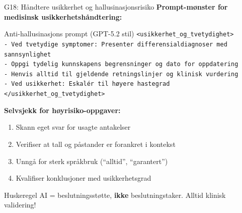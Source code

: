 \documentclass[aspectratio=169, 10pt]{beamer}
\begin{document}
\begin{frame}{G18: Håndtere usikkerhet og hallusinasjonsrisiko}
    \textbf{Prompt-mønster for medisinsk usikkerhetshåndtering:}
    
    \vspace{0.2cm}
    \begin{block}{\footnotesize Anti-hallusinasjons prompt (GPT-5.2 stil)}
        \scriptsize
        \texttt{<usikkerhet\_og\_tvetydighet>} \\
        \texttt{- Ved tvetydige symptomer: Presenter differensialdiagnoser med sannsynlighet} \\
        \texttt{- Oppgi tydelig kunnskapens begrensninger og dato for oppdatering} \\
        \texttt{- Henvis alltid til gjeldende retningslinjer og klinisk vurdering} \\
        \texttt{- Ved usikkerhet: Eskalér til høyere hastegrad} \\
        \texttt{</usikkerhet\_og\_tvetydighet>}
    \end{block}
    
    \vspace{0.15cm}
    \textbf{Selvsjekk for høyrisiko-oppgaver:}
    \footnotesize
    \begin{enumerate}
        \item Skann eget svar for usagte antakelser
        \item Verifiser at tall og påstander er forankret i kontekst
        \item Unngå for sterk språkbruk (``alltid'', ``garantert'')
        \item Kvalifiser konklusjoner med usikkerhetsgrad
    \end{enumerate}
    
    \normalsize
    \begin{alertblock}{\footnotesize Huskeregel}
        \footnotesize AI = beslutningsstøtte, \textbf{ikke} beslutningstaker. Alltid klinisk validering!
    \end{alertblock}
\end{frame}
\end{document}
